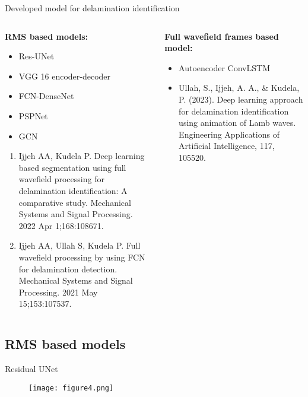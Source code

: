 \documentclass[10pt,aspectratio=169,dvipsnames]{beamer} %
\begin{document}
\begin{frame}{Developed model for delamination identification}
	\begin{columns}[T]
		\begin{column}[t]{0.45\textwidth}
			\textbf{RMS based models: \\}
			\begin{itemize}
				\item Res-UNet
				\item VGG 16 encoder-decoder
				\item FCN-DenseNet
				\item PSPNet
				\item GCN
			\end{itemize}
			{\tiny 
				\begin{enumerate}
					\item Ijjeh AA, Kudela P. Deep learning based segmentation using full wavefield processing for delamination identification: A comparative study. Mechanical Systems and Signal Processing. 2022 Apr 1;168:108671.
					\item Ijjeh AA, Ullah S, Kudela P. Full wavefield processing by using FCN for delamination detection. Mechanical Systems and Signal Processing. 2021 May 15;153:107537.					
			\end{enumerate}}
		\end{column}
		\hfill
		\begin{column}[t]{.45\textwidth}
			\textbf{Full wavefield frames based model:}
			\begin{itemize}
				\item Autoencoder ConvLSTM
			\end{itemize}
			\tiny
			\begin{itemize}
				\item Ullah, S., Ijjeh, A. A., \& Kudela, P. (2023). Deep learning approach for delamination identification using animation of Lamb waves. Engineering Applications of Artificial Intelligence, 117, 105520.
			\end{itemize}			
		\end{column}
	\end{columns}	
\end{frame}

\setcounter{subfigure}{0}
\subsection{RMS based models}

\begin{frame}{Residual UNet}
	\begin{figure}
		\centering
		\texttt{[image: figure4.png]}
	\end{figure}
\end{frame}
\end{document}

